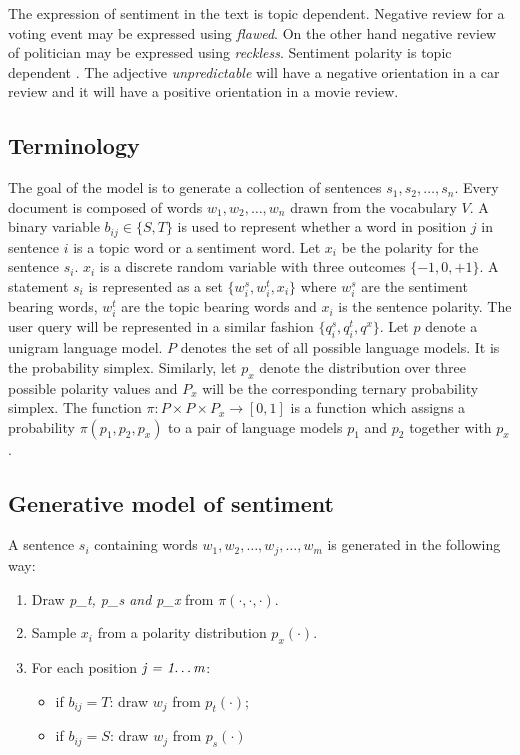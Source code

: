 The expression of sentiment in the text is topic dependent. Negative review for a voting event may be expressed using \textit{flawed}. On the other hand negative 
review of politician may be expressed using \textit{reckless}. Sentiment polarity is topic dependent \citep*{engstrom2004topic}. The adjective \textit{unpredictable}
will have a negative orientation in a car review and it will have a positive orientation in a movie review. 

\subsection{Terminology}

The goal of the model is to generate a collection of sentences \(s_1,s_2,\dots,s_n\). Every document is composed of words \(w_1,w_2,\dots,w_n\) drawn from the vocabulary
\(V\). A binary variable \(b_{ij} \in \{S,T\}\) is used to represent whether a word in position \(j\) in sentence \(i\) is a topic word or a sentiment word. Let \(x_i\)
be the polarity for the sentence \(s_i\). \(x_i\) is a discrete random variable with three outcomes \(\{-1,0,+1\}\). A statement \(s_i\) is represented as a set 
\(\{w_i^s,w_i^t,x_i\}\) where \(w_i^s\) are the sentiment bearing words, \(w_i^t\) are the topic bearing words and \(x_i\) is the sentence polarity. The user query will
be represented in a similar fashion \(\{q_i^s,q_i^t,q^x\}\). Let \(p\) denote a unigram language model. \(P\) denotes the set of all possible language models. It is the
probability simplex. Similarly, let \(p_x\) denote the distribution over three possible polarity values and \(P_x\) will be the corresponding ternary probability simplex.
The function \(\pi:P \times P \times P_x\to[0,1]\) is a function which assigns a probability \(\pi(p_1,p_2,p_x)\) to a pair of language models \(p_1\) and \(p_2\) together
with \(p_x\).

\subsection{Generative model of sentiment}

A sentence \(s_i\) containing words \(w_1,w_2,\dots,w_j,\dots,w_m\) is generated in the following way:

\begin{enumerate}
 \item Draw \textit{p_t, p_s and p_x} from \(\pi (\cdot,\cdot,\cdot)\).
 \item Sample \(x_i\) from a polarity distribution \(p_x(\cdot)\).
 \item For each position \(\textit{j = 1\dots m}\):
  \begin{itemize}
   \item if \(b_{ij}=T\): draw \(w_{j}\) from \(p_t(\cdot)\);
   \item if \(b_{ij}=S\): draw \(w_{j}\) from \(p_s(\cdot)\)
  \end{itemize}
\end{enumerate}

